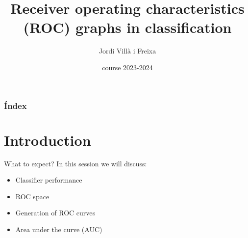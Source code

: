 \documentclass{beamer}
\title[ROC]{Receiver operating characteristics (ROC) graphs in classification} %
\author{Jordi Villà i Freixa} %
\institute[FCTE] %
{
Universitat de Vic - Universitat Central de Catalunya \\
Study Abroad\\ %
\medskip
\textit{jordi.villa@uvic.cat} %
}
\date{course 2023-2024}
\begin{document}
\begin{frame}
\titlepage %
\end{frame}

\begin{frame}
\frametitle{Índex} %
\tableofcontents %
\end{frame}


\section{Introduction} %


\begin{frame}{What to expect?}
  In this session we will discuss:
  \begin{itemize}
    \item Classifier performance
    \item ROC space
    \item Generation of ROC curves
    \item Area under the curve (AUC)
  \end{itemize}
\end{frame}
\end{document}
